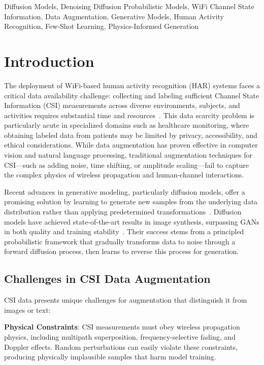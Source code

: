 \documentclass[journal]{IEEEtran}
\begin{document}
\begin{IEEEkeywords}
Diffusion Models, Denoising Diffusion Probabilistic Models, WiFi Channel State Information, Data Augmentation, Generative Models, Human Activity Recognition, Few-Shot Learning, Physics-Informed Generation
\end{IEEEkeywords}

\section{Introduction}

The deployment of WiFi-based human activity recognition (HAR) systems faces a critical data availability challenge: collecting and labeling sufficient Channel State Information (CSI) measurements across diverse environments, subjects, and activities requires substantial time and resources~\cite{yang2023sensefi}. This data scarcity problem is particularly acute in specialized domains such as healthcare monitoring, where obtaining labeled data from patients may be limited by privacy, accessibility, and ethical considerations. While data augmentation has proven effective in computer vision and natural language processing, traditional augmentation techniques for CSI—such as adding noise, time shifting, or amplitude scaling—fail to capture the complex physics of wireless propagation and human-channel interactions.

Recent advances in generative modeling, particularly diffusion models, offer a promising solution by learning to generate new samples from the underlying data distribution rather than applying predetermined transformations~\cite{ho2020denoising,song2021scorebased}. Diffusion models have achieved state-of-the-art results in image synthesis, surpassing GANs in both quality and training stability~\cite{dhariwal2021diffusion}. Their success stems from a principled probabilistic framework that gradually transforms data to noise through a forward diffusion process, then learns to reverse this process for generation.

\subsection{Challenges in CSI Data Augmentation}

CSI data presents unique challenges for augmentation that distinguish it from images or text:

\textbf{Physical Constraints}: CSI measurements must obey wireless propagation physics, including multipath superposition, frequency-selective fading, and Doppler effects. Random perturbations can easily violate these constraints, producing physically implausible samples that harm model training.
\end{document}
